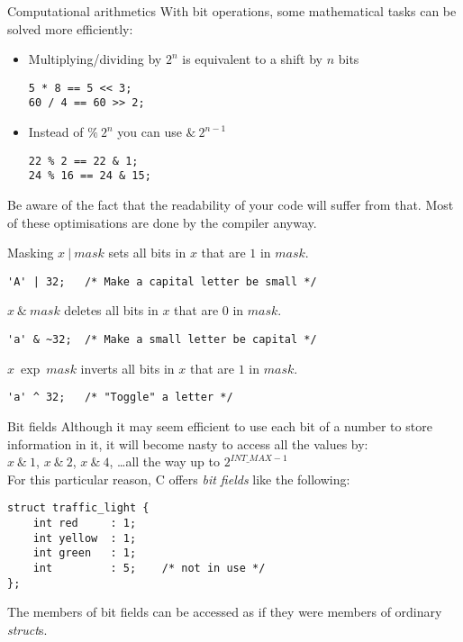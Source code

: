 \begin{frame}[fragile]{Computational arithmetics}
	With bit operations, some mathematical tasks can be solved more efficiently:
	\begin{itemize}
		\item Multiplying/dividing by $2^n$ is equivalent to a shift by $n$ bits
		\begin{lstlisting}
5 * 8 == 5 << 3;
60 / 4 == 60 >> 2;
\end{lstlisting}
		\item Instead of $\%\ 2^n$ you can use $\&\ 2^{n-1}$ 
		\begin{lstlisting}
22 % 2 == 22 & 1;
24 % 16 == 24 & 15;
\end{lstlisting}
	\end{itemize}\bigskip
	Be aware of the fact that the readability of your code will suffer from that. Most of these optimisations are done by the compiler anyway.
\end{frame}
\begin{frame}[fragile]{Masking}
	$x\ |\ mask$ sets all bits in $x$ that are $1$ in $mask$.\\
	\begin{lstlisting}
'A' | 32;	/* Make a capital letter be small */
\end{lstlisting}\bigskip
	$x\ \&\ mask$ deletes all bits in $x$ that are $0$ in $mask$.\\
	\begin{lstlisting}
'a' & ~32;	/* Make a small letter be capital */
\end{lstlisting}\bigskip
	$x\ \exp\ mask$ inverts all bits in $x$ that are $1$ in $mask$.\\
	\begin{lstlisting}
'a' ^ 32;	/* "Toggle" a letter */
\end{lstlisting}
\end{frame}

\begin{frame}[fragile]{Bit fields}
	Although it may seem efficient to use each bit of a number to store information in it, it will become nasty to access all the values by:\\
	$x\ \&\ 1$, $x\ \&\ 2$, $x\ \&\ 4$, \dots all the way up to $2^{INT\_MAX - 1}$\\
	\bigskip
	For this particular reason, C offers \textit{bit fields} like the following:
	\begin{lstlisting}
struct traffic_light {
	int red		: 1;
	int yellow	: 1;
	int green	: 1;
	int			: 5;	/* not in use */
};
\end{lstlisting}
	The members of bit fields can be accessed as if they were members of ordinary \textit{struct}s.

\end{frame}

